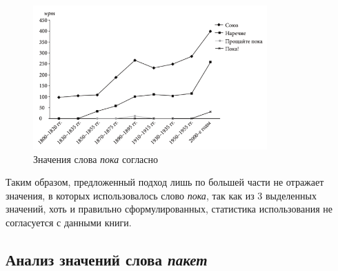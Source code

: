 \documentclass[LI,VKR]{HSEUniversity}
\begin{document}
\begin{figure}[H]
    \centering %
    \includegraphics[width=0.8\textwidth]{img/book/poka/all}
    \caption{Значения слова \textit{пока} согласно~\cite{TwoCenturies}}
    \label{fig:TwoCenturiesPoka}
\end{figure}

Таким образом, предложенный подход лишь по большей части не отражает значения, в которых использовалось
слово \textit{пока}, так как из 3 выделенных значений, хоть и правильно сформулированных,
статистика использования не согласуется с данными книги.

\subsection*{Анализ значений слова \textit{пакет}}
\end{document}

